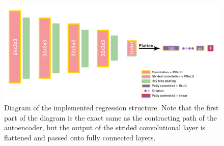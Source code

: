 \begin{figure}[h]
    \centering
    \includegraphics[width=\textwidth]{dissertation/figures/regression_final_structure.png}
    \caption{Diagram of the implemented regression structure. Note that the first part of the diagram is the exact same as the contracting path of the autoencoder, but the output of the strided convolutional layer is flattened and passed onto fully connected layers.}
    \label{fig:regression_details}
\end{figure}

